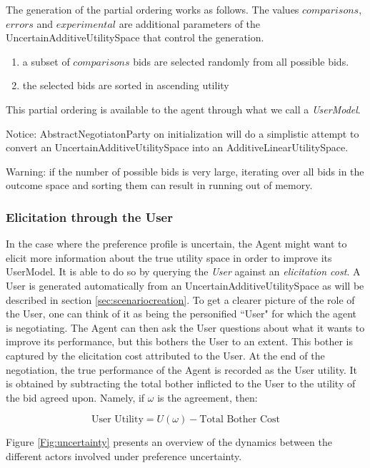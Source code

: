 \documentclass[]{article}
\begin{document}
The generation of the partial ordering works as follows. The values $comparisons$, $errors$ and $experimental$ are additional parameters of the UncertainAdditiveUtilitySpace that control the generation. 
\begin{enumerate}
\item a subset of $comparisons$ bids are selected randomly from all possible bids. 
\item the selected bids are sorted in ascending utility
\end{enumerate}

This partial ordering is available to the agent through what we call a \textit{UserModel}.

Notice: AbstractNegotiatonParty on initialization will do a simplistic attempt to convert an UncertainAdditiveUtilitySpace into an AdditiveLinearUtilitySpace. 

Warning: if the number of possible bids is very large, iterating over all bids in the outcome space and sorting them can result in running out of memory.  

\subsubsection{Elicitation through the User}

In the case where the preference profile is uncertain, the Agent might want to elicit more information about the true utility space in order to improve its UserModel. It is able to do so by querying the \textit{User} against an \textit{elicitation cost}. A User is generated automatically from an UncertainAdditiveUtilitySpace as will be described in section \ref{sec:scenariocreation}. To get a clearer picture of the role of the User, one can think of it as being the personified ``User" for which the agent is negotiating. The Agent can then ask the User questions about what it wants to improve its performance, but this bothers the User to an extent. This bother is captured by the elicitation cost attributed to the User. At the end of the negotiation, the true performance of the Agent is recorded as the User utility. It is obtained by subtracting the total bother inflicted to the User to the utility of the bid agreed upon. Namely, if $\omega$ is the agreement, then:

\begin{equation}
	\text{User Utility}=U(\omega)-\text{Total Bother Cost}
\end{equation}

Figure \ref{Fig:uncertainty} presents an overview of the dynamics between the different actors involved under preference uncertainty.
\end{document}
